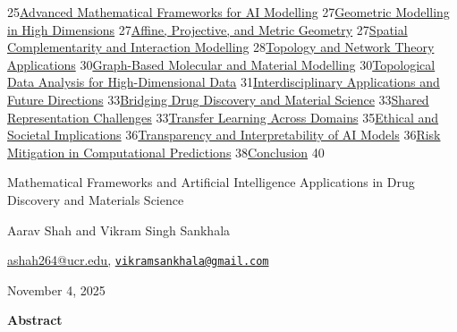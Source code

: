 \documentclass[
]{article}
\begin{document}
25\protect\hyperlink{advanced-mathematical-frameworks-for-ai-modelling}{Advanced
Mathematical Frameworks for AI Modelling}
27\protect\hyperlink{geometric-modelling-in-high-dimensions}{Geometric
Modelling in High Dimensions}
27\protect\hyperlink{affine-projective-and-metric-geometry}{Affine,
Projective, and Metric Geometry}
27\protect\hyperlink{spatial-complementarity-and-interaction-modelling}{Spatial
Complementarity and Interaction Modelling}
28\protect\hyperlink{topology-and-network-theory-applications}{Topology
and Network Theory Applications}
30\protect\hyperlink{graph-based-molecular-and-material-modelling}{Graph-Based
Molecular and Material Modelling}
30\protect\hyperlink{topological-data-analysis-for-high-dimensional-data}{Topological
Data Analysis for High-Dimensional Data}
31\protect\hyperlink{interdisciplinary-applications-and-future-directions}{Interdisciplinary
Applications and Future Directions}
33\protect\hyperlink{bridging-drug-discovery-and-material-science}{Bridging
Drug Discovery and Material Science}
33\protect\hyperlink{shared-representation-challenges}{Shared
Representation Challenges}
33\protect\hyperlink{transfer-learning-across-domains}{Transfer Learning
Across Domains}
35\protect\hyperlink{ethical-and-societal-implications}{Ethical and
Societal Implications}
36\protect\hyperlink{transparency-and-interpretability-of-ai-models}{Transparency
and Interpretability of AI Models}
36\protect\hyperlink{risk-mitigation-in-computational-predictions}{Risk
Mitigation in Computational Predictions}
38\protect\hyperlink{conclusion}{Conclusion} 40

Mathematical Frameworks and Artificial Intelligence Applications in Drug
Discovery and Materials Science

Aarav Shah and Vikram Singh Sankhala

\href{mailto:ashah264@ucr.edu}{ashah264@ucr.edu,}
\href{mailto:vikramsankhala@gmail.com}{\nolinkurl{vikramsankhala@gmail.com}}

November 4, 2025

\textbf{Abstract}
\end{document}
